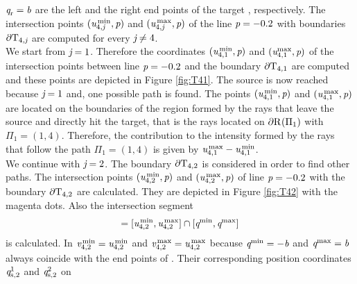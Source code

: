 $\textit{q}_\textrm{r}= \textit{b}$ are the left and the right end points of the target , respectively.
 The intersection points $(\textit{u}_{4,\textit{j}}^\textrm{\,min}, \textit{p})$ and
$(\textit{u}_{4,\textit{j}}^\textrm{\,max}, \textit{p})$
of the line $\textit{p}= -0.2$
 with boundaries $\partial\mbox{$\textup{T}_{\textit{$4$,\textit{j}}}$}$ are computed for every $\textit{j}\neq 4$. \\ \indent
We start from $\textit{j}=1$. Therefore the coordinates  $(\textit{u}_{4,1}^\textrm{\,min}, \textit{p})$ and
$(\textit{u}_{4,1}^\textrm{max}, \textit{p})$ of the intersection points between line $\textit{p} = -0.2$ and the boundary $\partial\mbox{$\textup{T}_{\textit{$4$,$1$}}$}$ are computed and these points are depicted in Figure \ref{fig:T41}.
 The source is now reached because $\textit{j} = 1$ and, one possible path is found.
 The points $(\textit{u}_{4,1}^\textrm{\,min}, \textit{p})$
and $(\textit{u}_{4,1}^\textrm{\,max}, \textit{p})$ are located on the boundaries of the region formed by the rays that leave the source and directly hit the target, that is the rays located on
$\partial \mbox{$\textup{R}_{\textit{}}$}(\Pi_1)$ with $\Pi_1 = (1,4)$.
Therefore, the contribution to the intensity formed by the rays that follow the path $\Pi_1 = (1,4)$ is given by 
$\textit{u}_{4,1}^\textrm{\,max}-\textit{u}_{4,1}^\textrm{\,min}$. \\ \indent
We continue with $\textit{j} = 2$. 
The boundary $\partial\mbox{$\textup{T}_{\textit{$4$,$2$}}$}$ is considered in order to find other paths.
The intersection points $(\textit{u}_{4,2}^\textrm{\,min}, \textit{p})$ and
$(\textit{u}_{4,2}^\textrm{\,max}, \textit{p})$ of line
$\textit{p}=-0.2$ with the boundary
$\partial\mbox{$\textup{T}_{\textit{$4$,$2$}}$}$ are calculated.
They are depicted in Figure \ref{fig:T42} with the magenta dots. Also the intersection segment 
\begin{equation}
[\variabile{v}_{4,2}^\textrm{\,min}, \variabile{v}_{4,2}^\textrm{\,max}] = [\variabile{u}_{4,2}^\textrm{\,min}, \variabile{u}_{4,2}^\textrm{\,max}]\cap [\variabile{q}^\textrm{min}, \variabile{q}^\textrm{max}]
\end{equation}
is calculated. In  $\textit{v}_{4,2}^\textrm{\,min} = \textit{u}_{4,2}^\textrm{\,min}$ and $\textit{v}_{4,2}^\textrm{\,max} = \textit{u}_{4,2}^\textrm{\,max}$ because $\textit{q}^\textrm{min} = -\textit{b}$ and $\textit{q}^\textrm{max} = \textit{b}$ always coincide with the end points of .
Their corresponding position coordinates $\textit{q}_{\textrm{s,} \textit{$2$}}^1$ and $\textit{q}_{\textrm{s,} \textit{$2$}}^2$ on 
